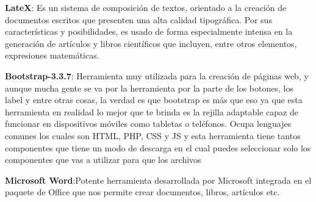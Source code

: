 \textbf{LateX}: Es un sistema de composición de textos, orientado a la creación de documentos escritos que presenten una alta calidad tipográfica. Por sus características y posibilidades, es usado de forma especialmente intensa en la generación de artículos y libros científicos que incluyen, entre otros elementos, expresiones matemáticas.

\textbf{Bootstrap-3.3.7}: Herramienta muy utilizada para la creación de páginas web, y aunque mucha gente se va por la herramienta por la parte de los botones, los label y entre otras cosas, la verdad es que bootstrap es más que eso ya que esta herramienta en realidad lo mejor que te brinda es la rejilla adaptable capaz de funcionar en dispositivos móviles como tabletas o teléfonos. Ocupa lenguajes comunes los cuales son HTML, PHP, CSS y JS y esta herramienta tiene tantos componentes que tiene un modo de descarga en el cual puedes seleccionar solo los componentes que vas a utilizar para que los archivos

\textbf{Microsoft Word}:Potente herramienta desarrollada por Microsoft integrada en el paquete de Office que nos permite crear documentos, libros, artículos etc.
